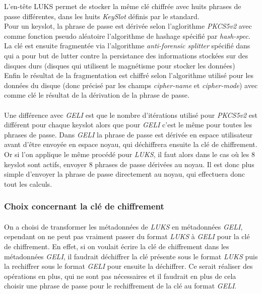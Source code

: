 L'en-tête LUKS permet de stocker la même clé chiffrée avec huits phrases de passe
différentes, dans les huits {\em KeySlot} définis par le standard.
\\
Pour un keyslot, la phrase de passe est dérivée selon l'aglorithme {\em PKCS5v2}
avec comme fonction pseudo aléatoire l'algorithme de hashage spécifié par 
{\em hash-spec}. La clé est ensuite fragmentée via l'algorithme 
{\em anti-forensic splitter} spécifié dans \cite{AFsplitting} qui a pour but de
lutter contre la persistance des informations stockées sur des disques durs
(disques qui utilisent le magnétisme pour stocker les données)
\\
Enfin le résultat de la fragmentation est chiffré selon l'algorithme utilisé 
pour les données du disque (donc précisé par les champs {\em cipher-name} et 
{\em cipher-mode}) avec comme clé le résultat de la dérivation de la phrase de
passe.

\paragraph{}
Une différence avec {\em GELI} est que le nombre d'itérations utilisé pour 
{\em PKCS5v2} est différent pour chaque keyslot alors que pour {\em GELI} c'est
le même pour toutes les phrases de passe.
Dans {\em GELI} la phrase de passe est dérivée en espace utilisateur avant 
d'être envoyée en espace noyau, qui déchiffrera ensuite la clé de chiffrement.
Or si l'on applique le même procédé pour {\em LUKS}, il faut alors dans le cas
où les 8 keyslot sont actifs, envoyer 8 phrases de passe dérivées au noyau.
Il est donc plus simple d'envoyer la phrase de passe directement au noyau, qui
effectuera donc tout les calculs.

\subsubsection{Choix concernant la clé de chiffrement}
\paragraph{}
On a choisi de transformer les métadonnées de {\em LUKS} en métadonnées 
{\em GELI}, cependant on ne peut pas vraiment passer du format {\em LUKS} à 
{\em GELI} pour la clé de chiffrement. En effet, si on voulait écrire la clé 
de chiffrement dans les métadonnées {\em GELI}, il faudrait déchiffrer la clé 
présente sous le format {\em LUKS} puis la rechiffrer sous le format {\em GELI}
pour ensuite la déchiffrer. Ce serait réaliser des opérations en plus, qui ne 
sont pas nécessaires et il faudrait en plus de cela choisir une phrase de passe
pour le rechiffrement de la clé au format {\em GELI}. 

